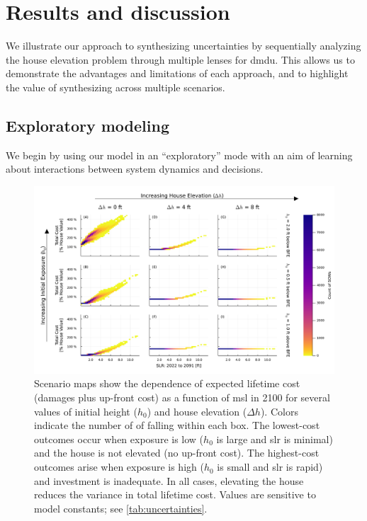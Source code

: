 \documentclass{agujournal2019}
\begin{document}
\section{Results and discussion}\label{sec:results}

We illustrate our approach to synthesizing uncertainties by sequentially analyzing the house elevation problem through multiple lenses for \gls{dmdu}.
This allows us to demonstrate the advantages and limitations of each approach, and to highlight the value of synthesizing across multiple scenarios.

\subsection{Exploratory modeling}\label{sec:results-exploratory}

We begin by using our model in an ``exploratory'' mode with an aim of learning about interactions between system dynamics and decisions.

\begin{figure}
  \includegraphics[width=\textwidth]{scenario-map-slr-cost}
  \caption{
    Scenario maps show the dependence of expected lifetime cost (damages plus up-front cost) as a function of \acrfull{msl} in 2100 for several values of initial height ($h_0$) and house elevation ($\Delta h$).
    Colors indicate the number of  of falling within each box.
    The lowest-cost outcomes occur when exposure is low ($h_0$ is large and \acrfull{slr} is minimal) and the house is not elevated (no up-front cost).
    The highest-cost outcomes arise when exposure is high ($h_0$ is small and \gls{slr} is rapid) and investment is inadequate.
    In all cases, elevating the house reduces the variance in total lifetime cost.
    Values are sensitive to model constants; see \cref{tab:uncertainties}.
  }\label{fig:scenario-map-slr-cost}
\end{figure}
\end{document}
